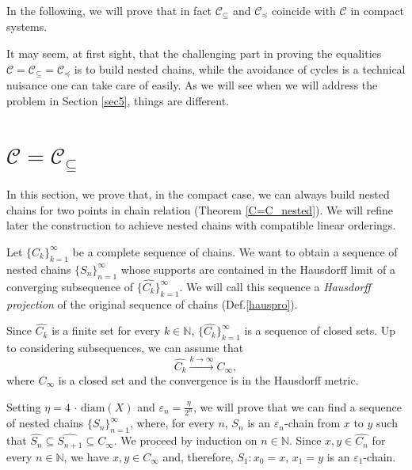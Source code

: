 \documentclass[10pt,a4paper]{article}
\theoremstyle{definition}
\theoremstyle{remark}
\theoremstyle{plain}
\begin{document}
In the following, we will prove that in fact $\mathcal{C}_\subseteq$ and $\mathcal{C}_\preceq$ coincide with $\mathcal{C}$ in compact systems. 

It may seem, at first sight, that the challenging part in proving the equalities $\mathcal{C}=\mathcal{C}_\subseteq=\mathcal{C}_\preceq$ is to build nested chains, while the avoidance of cycles is a technical nuisance one can take care of easily. As we will see when we will address the problem in Section \ref{sec5}, things are different. 

\section{\texorpdfstring{$\mathcal{C}=\mathcal{C}_\subseteq$}{C=C\_subseteq}}\label{section_Cnest}

In this section, we prove that, in the compact case, we can always build nested chains for two points in chain relation (Theorem \ref{C=C_nested}). We will refine later the construction to achieve nested chains with compatible linear orderings. 



Let $\{C_k\}_{k=1}^\infty$ be a complete sequence of chains. We want to obtain a sequence of nested chains $\{S_n\}_{n=1}^\infty$ whose supports are contained in the Hausdorff limit of a converging subsequence of $\{\widehat{C_k}\}_{k=1}^\infty$. We will call this sequence a \textit{Hausdorff projection} of the original sequence of chains (Def.\ref{hauspro}).

    Since $\widehat{C_k}$ is a finite set for every $k\in\mathbb N$, $\{\widehat{C_k}\}_{k=1}^\infty$ is a sequence of closed sets. Up to considering subsequences, we can assume that 
    \begin{equation}
    \label{hausconv}
        \widehat{C_k}\xrightarrow{k\to\infty}C_\infty,
    \end{equation}
    where $C_\infty$ is a closed set and the convergence is in the Hausdorff metric.

    Setting $\eta=4\,\cdot\,\mbox{diam}(X)$ and $\varepsilon_n=\frac{\eta}{2^n}$, we will prove that we can find a sequence of nested chains $\{S_n\}_{n=1}^\infty$, where, for every $n$, $S_n$ is an $\varepsilon_n$-chain from $x$ to $y$ such that $\widehat{S_n}\subseteq\widehat{S_{n+1}}\subseteq C_\infty$.
    We proceed by induction on $n\in\mathbb{N}$. 
    Since $x,y\in \widehat{C_n}$ for every $n\in\mathbb N$, we have $x,y\in C_\infty$ and, therefore, $S_1:x_0=x,\,x_1=y$ is an $\varepsilon_1$-chain.
\end{document}
